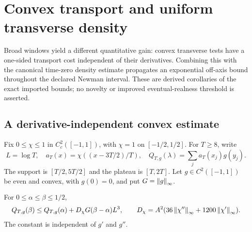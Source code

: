 \section{Convex transport and uniform transverse density}
\label{sec:density-transport}

Broad windows yield a different quantitative gain: convex transverse
tests have a one-sided transport cost independent of their derivatives.
Combining this with the canonical time-zero density estimate propagates
an exponential off-axis bound throughout the declared Newman interval.
These are derived corollaries of the exact imported bounds; no novelty
or improved eventual-realness threshold is asserted.

\subsection{A derivative-independent convex estimate}
Fix \(0\le\chi\le1\) in \(C_c^2([-1,1])\), with \(\chi=1\) on
\([-1/2,1/2]\). For \(T\ge8\), write
\[
 L=\log T,\quad a_T(x)=\chi((x-3T/2)/T),\quad
 Q_{T,g}(\lambda)=\sum_j a_T(x_j)g(y_j).
\]
The support is \([T/2,5T/2]\) and the plateau is \([T,2T]\).
Let \(g\in C^2([-1,1])\) be even and convex, with \(g(0)=0\),
and put \(G=\left\lVert g\right\rVert_\infty\).
\begin{theorem}\label{thm:convex-transport}
For \(0\le\alpha\le\beta\le1/2\),
\begin{equation}\label{eq:convex-transport}
 Q_{T,g}(\beta)\le Q_{T,g}(\alpha)+D_\chi G(\beta-\alpha)L^3,
 \qquad D_\chi=A^2(36\left\lVert\chi''\right\rVert_\infty+1200\left\lVert\chi'\right\rVert_\infty).
\end{equation}
The constant is independent of \(g'\) and \(g''\).
\end{theorem}
